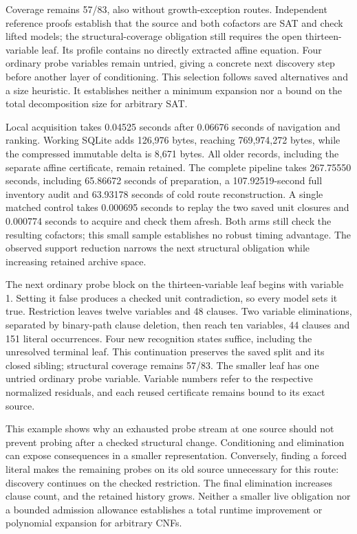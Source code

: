 \documentclass[11pt,a4paper]{article}
\numberwithin{equation}{section}
\theoremstyle{plain}
\theoremstyle{definition}
\theoremstyle{remark}
\begin{document}
Coverage remains 57/83, also without growth-exception routes. Independent reference proofs establish that the source and both cofactors are SAT and check lifted models; the structural-coverage obligation still requires the open thirteen-variable leaf. Its profile contains no directly extracted affine equation. Four ordinary probe variables remain untried, giving a concrete next discovery step before another layer of conditioning. This selection follows saved alternatives and a size heuristic. It establishes neither a minimum expansion nor a bound on the total decomposition size for arbitrary SAT.

Local acquisition takes 0.04525 seconds after 0.06676 seconds of navigation and ranking. Working SQLite adds 126,976 bytes, reaching 769,974,272 bytes, while the compressed immutable delta is 8,671 bytes. All older records, including the separate affine certificate, remain retained. The complete pipeline takes 267.75550 seconds, including 65.86672 seconds of preparation, a 107.92519-second full inventory audit and 63.93178 seconds of cold route reconstruction. A single matched control takes 0.000695 seconds to replay the two saved unit closures and 0.000774 seconds to acquire and check them afresh. Both arms still check the resulting cofactors; this small sample establishes no robust timing advantage. The observed support reduction narrows the next structural obligation while increasing retained archive space.

The next ordinary probe block on the thirteen-variable leaf begins with variable 1. Setting it false produces a checked unit contradiction, so every model sets it true. Restriction leaves twelve variables and 48 clauses. Two variable eliminations, separated by binary-path clause deletion, then reach ten variables, 44 clauses and 151 literal occurrences. Four new recognition states suffice, including the unresolved terminal leaf. This continuation preserves the saved split and its closed sibling; structural coverage remains 57/83. The smaller leaf has one untried ordinary probe variable. Variable numbers refer to the respective normalized residuals, and each reused certificate remains bound to its exact source.

This example shows why an exhausted probe stream at one source should not prevent probing after a checked structural change. Conditioning and elimination can expose consequences in a smaller representation. Conversely, finding a forced literal makes the remaining probes on its old source unnecessary for this route: discovery continues on the checked restriction. The final elimination increases clause count, and the retained history grows. Neither a smaller live obligation nor a bounded admission allowance establishes a total runtime improvement or polynomial expansion for arbitrary CNFs.
\end{document}

